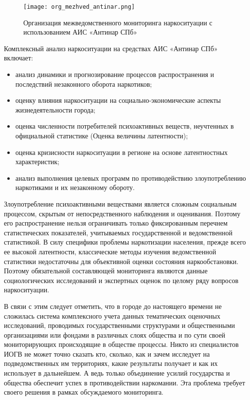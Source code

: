 \begin{figure}
    \texttt{[image: org\_mezhved\_antinar.png]}
    \caption{Организация межведомственного мониторинга наркоситуации с
    использованием АИС «Антинар СПб»}
    \label{fig:org_mezhved_antinar}
\end{figure}

Комплексный анализ наркоситуации на средствах АИС «Антинар СПб» включает:
\begin{itemize}
\item анализ динамики и прогнозирование  процессов  распространения и последствий
незаконного оборота наркотиков;
\item оценку влияния наркоситуации на социально-экономические аспекты
жизнедеятельности города;
\item оценка численности потребителей психоактивных веществ, неучтенных в
официальной статистике (Оценка величины латентности);
\item оценка кризисности наркоситуации в регионе на основе латентностных
характеристик;
\item анализ выполнения целевых программ по противодействию злоупотреблению
наркотиками и их незаконному обороту.
\end{itemize}

Злоупотребление психоактивными веществами является сложным социальным процессом,
скрытым от непосредственного наблюдения и оценивания. Поэтому его
распространение нельзя ограничивать только фиксированным перечнем статистических
показателей, учитываемых государственной и ведомственной статистикой. В силу
специфики проблемы наркотизации населения, прежде всего ее высокой латентности,
классические методы изучения ведомственной статистики недостаточны для
объективной оценки состояния наркообстановки. Поэтому обязательной составляющей
мониторинга являются данные социологических исследований и экспертных оценок  по
целому ряду вопросов наркоситуации.

В связи с этим следует отметить, что в городе до настоящего времени не сложилась
система комплексного учета данных тематических оценочных исследований,
проводимых государственными структурами и общественными организациями или
фондами  в различных слоях общества и по сути своей мониторирующих происходящие
в обществе процессы. Никто из специалистов  ИОГВ не может точно сказать кто,
сколько, как и зачем исследует на подведомственных им территориях, какие
результаты получает и как их использует в дальнейшем. А ведь только объединение
усилий государства и общества обеспечит успех в противодействии наркомании. Эта
проблема требует своего решения в рамках обсуждаемого мониторинга.

